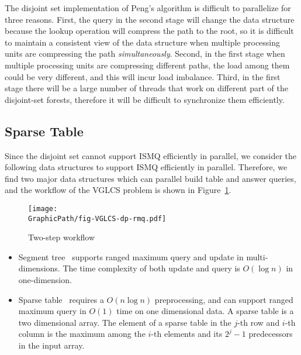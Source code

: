 

The disjoint set implementation of Peng's algorithm is difficult to
parallelize for three reasons.  First, the query in the second stage
will change the data structure because the lookup operation will
compress the path to the root, so it is difficult to maintain a
consistent view of the data structure when multiple processing units
are compressing the path {\em simultaneously}.  Second, in the first
stage when multiple processing units are compressing different paths,
the load among them could be very different, and this will incur load
imbalance.  Third, in the first stage there will be a large number of
threads that work on different part of the disjoint-set forests,
therefore it will be difficult to synchronize them efficiently.

\subsection{Sparse Table}

Since the disjoint set cannot support ISMQ efficiently in parallel, we
consider the following data structures to support ISMQ efficiently in
parallel.  Therefore, we find two major data structures which can
parallel build table and answer queries, and the workflow of the VGLCS
problem is shown in Figure~\ref{fig:fig-VGLCS-dp-rmq}.


\begin{figure}
  \texttt{[image: \\GraphicPath/fig-VGLCS-dp-rmq.pdf]}
  \caption{Two-step workflow}
  \label{fig:fig-VGLCS-dp-rmq}
\end{figure}


\begin{itemize}
  \item Segment tree~\cite{berg2000computational} supports ranged
    maximum query and update in multi-dimensions.  The time complexity
    of both update and query is $O(\log n)$ in one-dimension.
  \item Sparse table~\cite{Berkman1993RecursiveSP} requires a $O(n
    \log n)$ preprocessing, and can support ranged maximum query in
    $O(1)$ time on one dimensional data.  A sparse table is a two
    dimensional array.  The element of a sparse table in the $j$-th
    row and $i$-th column is the maximum among the $i$-th elements
    and its $2^j - 1$ predecessors in the input array.
\end{itemize}

